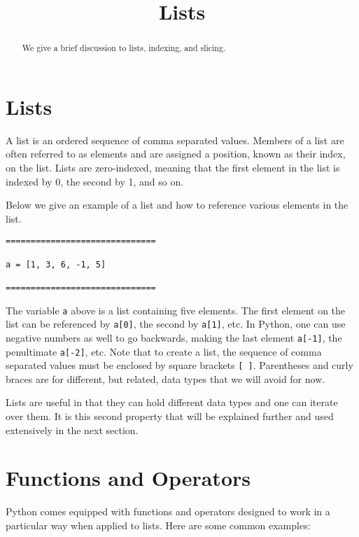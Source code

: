 \documentclass{ximera}
\title{Lists}
\begin{document}
  
\begin{abstract}  
We give a brief discussion to lists, indexing, and slicing.
\end{abstract}  
\maketitle

\section{Lists}

A list is an ordered sequence of comma separated values. Members of a list are often referred to as elements and are assigned a position, known as their index, on the list. Lists are zero-indexed, meaning that the first element in the list is indexed by 0, the second by 1, and so on.

Below we give an example of a list and how to reference various elements in the list.

\begin{verbatim}
==============================

a = [1, 3, 6, -1, 5]

==============================
\end{verbatim}

The variable \verb|a| above is a list containing five elements. The first element on the list can be referenced by \verb|a[0]|, the second by \verb|a[1]|, etc. In Python, one can use negative numbers as well to go backwards, making the last element \verb|a[-1]|, the penultimate \verb|a[-2]|, etc. Note that to create a list, the sequence of comma separated values must be enclosed by square brackets \verb|[ ]|. Parentheses and curly braces are for different, but related, data types that we will avoid for now.

Lists are useful in that they can hold different data types and one can iterate over them. It is this second property that will be explained further and used extensively in the next section. 

\section{Functions and Operators}

Python comes equipped with functions and operators designed to work in a particular way when applied to lists. Here are some common examples:
\end{document}
